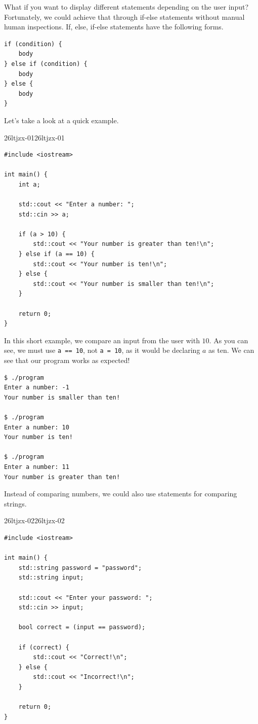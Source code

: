 \documentclass[../../../main.tex]{subfiles}
\begin{document}
What if you want to display different statements depending on
the user input? Fortunately, we could achieve that through
if-else statements without manual human inspections. If, else,
if-else statements have the following forms.

\begin{basicbox}
\begin{lstlisting}[style=basic]
if (condition) {
    body
} else if (condition) {
    body
} else {
    body
}
\end{lstlisting}
\end{basicbox}

Let's take a look at a quick example.

\begin{cppbox}{26ltjzx-01}{26ltjzx-01}
\begin{lstlisting}[style=cppstyle]
#include <iostream>

int main() {
    int a;

    std::cout << "Enter a number: ";
    std::cin >> a;

    if (a > 10) {
        std::cout << "Your number is greater than ten!\n";
    } else if (a == 10) {
        std::cout << "Your number is ten!\n";
    } else {
        std::cout << "Your number is smaller than ten!\n";
    }

    return 0;
}
\end{lstlisting}
\end{cppbox}

In this short example, we compare an input from the user with $10$.
As you can see, we must use \verb|a == 10|, not \verb|a = 10|, as
it would be declaring $a$ as ten. We can see that our program works
as expected!

\begin{outputbox}
\begin{lstlisting}[style=basic]
$ ./program
Enter a number: -1
Your number is smaller than ten!

$ ./program
Enter a number: 10
Your number is ten!

$ ./program
Enter a number: 11
Your number is greater than ten!
\end{lstlisting}
\end{outputbox}

Instead of comparing numbers, we could also use statements for
comparing strings.

\begin{cppbox}{26ltjzx-02}{26ltjzx-02}
\begin{lstlisting}[style=cppstyle]
#include <iostream>

int main() {
    std::string password = "password";
    std::string input;

    std::cout << "Enter your password: ";
    std::cin >> input;

    bool correct = (input == password);

    if (correct) {
        std::cout << "Correct!\n";
    } else {
        std::cout << "Incorrect!\n";
    }

    return 0;
}
\end{lstlisting}
\end{cppbox}
\end{document}
